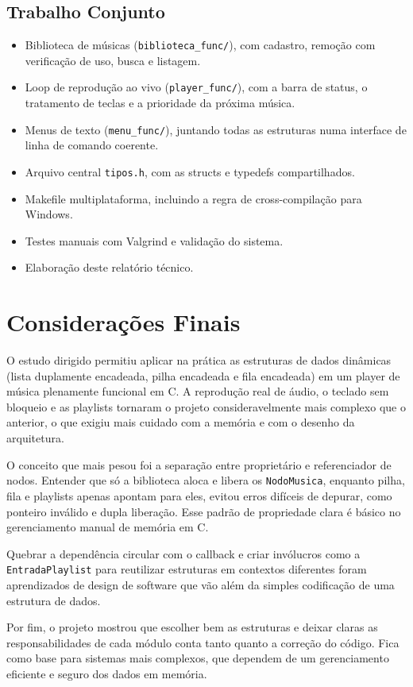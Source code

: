 \documentclass[
    12pt
    ,oneside
    ,a4paper
    ,chapter=TITLE
    ,section=TITLE
    ,sumario=abnt-6027-2012]{abntex2}
\begin{document}
\section*{Trabalho Conjunto}
\begin{itemize}
    \item Biblioteca de músicas (\texttt{biblioteca\_func/}), com cadastro, remoção com verificação de uso, busca e listagem.
    \item Loop de reprodução ao vivo (\texttt{player\_func/}), com a barra de status, o tratamento de teclas e a prioridade da próxima música.
    \item Menus de texto (\texttt{menu\_func/}), juntando todas as estruturas numa interface de linha de comando coerente.
    \item Arquivo central \texttt{tipos.h}, com as structs e typedefs compartilhados.
    \item Makefile multiplataforma, incluindo a regra de cross-compilação para Windows.
    \item Testes manuais com Valgrind e validação do sistema.
    \item Elaboração deste relatório técnico.
\end{itemize}

\chapter{Considerações Finais}
\label{cap:conclusao}

O estudo dirigido permitiu aplicar na prática as estruturas de dados dinâmicas (lista duplamente encadeada, pilha encadeada e fila encadeada) em um player de música plenamente funcional em C. A reprodução real de áudio, o teclado sem bloqueio e as playlists tornaram o projeto consideravelmente mais complexo que o anterior, o que exigiu mais cuidado com a memória e com o desenho da arquitetura.

O conceito que mais pesou foi a separação entre proprietário e referenciador de nodos. Entender que só a biblioteca aloca e libera os \texttt{NodoMusica}, enquanto pilha, fila e playlists apenas apontam para eles, evitou erros difíceis de depurar, como ponteiro inválido e dupla liberação. Esse padrão de propriedade clara é básico no gerenciamento manual de memória em C.

Quebrar a dependência circular com o callback e criar invólucros como a \texttt{EntradaPlaylist} para reutilizar estruturas em contextos diferentes foram aprendizados de design de software que vão além da simples codificação de uma estrutura de dados.

Por fim, o projeto mostrou que escolher bem as estruturas e deixar claras as responsabilidades de cada módulo conta tanto quanto a correção do código. Fica como base para sistemas mais complexos, que dependem de um gerenciamento eficiente e seguro dos dados em memória.

\postextual


\end{document}

